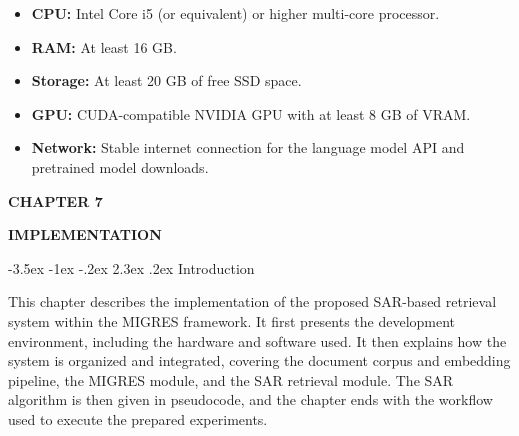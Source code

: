 \documentclass[12pt,a4paper]{report}
\makeatletter
\renewcommand\section{\@startsection{section}{1}{\z@}%
    {-3.5ex \@plus -1ex \@minus -.2ex}%
    {2.3ex \@plus.2ex}%
    {\normalfont\fontsize{16}{19}\selectfont\bfseries}}
\newcommand{\chaptertitle}[2]{
    \begin{flushright}
        {\fontsize{22}{26}\selectfont\bfseries CHAPTER #1\par}
        \vspace{0.10in}
        {\fontsize{22}{26}\selectfont\bfseries #2\par}
    \end{flushright}
    \vspace{0.12in}
}
\makeatother
\begin{document}
\begin{itemize}
    \item \textbf{CPU:} Intel Core i5 (or equivalent) or higher multi-core processor.
    \item \textbf{RAM:} At least 16 GB.
    \item \textbf{Storage:} At least 20 GB of free SSD space.
    \item \textbf{GPU:} CUDA-compatible NVIDIA GPU with at least 8 GB of VRAM.
    \item \textbf{Network:} Stable internet connection for the language model API and pretrained model downloads.
\end{itemize}
\label{ch:6:end}

\clearpage


\setcounter{table}{0}
\renewcommand{\thetable}{7.\arabic{table}}
\renewcommand{\theHtable}{chapter7.\arabic{table}}
\setcounter{figure}{0}
\renewcommand{\thefigure}{7.\arabic{figure}}
\renewcommand{\theHfigure}{chapter7.\arabic{figure}}
\setcounter{chapter}{7}
\setcounter{section}{0}
\setcounter{subsection}{0}

\chaptertitle{7}{IMPLEMENTATION}
\label{ch:7}
\justifying

\section{Introduction}

This chapter describes the implementation of the proposed SAR-based
retrieval system within the MIGRES framework. It first presents the
development environment, including the hardware and software used. It
then explains how the system is organized and integrated, covering the
document corpus and embedding pipeline, the MIGRES module, and the SAR
retrieval module. The SAR algorithm is then given in pseudocode, and the
chapter ends with the workflow used to execute the prepared experiments.

\end{document}
